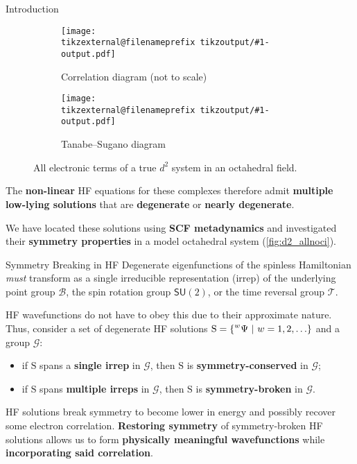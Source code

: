 \documentclass[final, xcolor={svgnames}]{beamer}
\makeatletter
\newif\iftikzex
\newcommand*{\useexternalfile}[1]{%
		\iftikzex
			\tikzsetnextfilename{tikzoutput/#1-output}%
			\scalebox{1}{}
		\else
			\texttt{[image: \\tikzexternal@filenameprefix tikzoutput/\#1-output.pdf]}
		\fi
	}
\newlength{\colwidth}
\makeatother
\begin{document}
\begin{frame}[t]
\begin{columns}[t]
\begin{column}{\colwidth}
\begin{block}{Introduction}
				\begin{figure}
					\begin{subfigure}[b]{0.49\textwidth}
						\centering
						\useexternalfile{corrd2}
						\caption{Correlation diagram (not to scale)}
					\end{subfigure}
					\hfill
					\begin{subfigure}[b]{0.49\textwidth}
						\centering
						\useexternalfile{TSd2}
						\caption{Tanabe--Sugano diagram}
					\end{subfigure}
					\caption{All electronic terms of a true $d^2$ system in an octahedral field.}
					\label{fig:corrTSd2}
				\end{figure}
				
			The \textbf{\color{Blue} non-linear} HF equations for these complexes therefore admit \textbf{\color{Blue} multiple low-lying solutions} that are \textbf{\color{Blue} degenerate} or \textbf{\color{Blue} nearly degenerate}.
			
			We have located these solutions using \textbf{\color{red} SCF metadynamics} and investigated their \textbf{\color{red} symmetry properties} in a model octahedral  system (\cref{fig:d2_allnoci}).
	  	\end{block}
	
		\begin{alertblock}{Symmetry Breaking in HF}
			Degenerate eigenfunctions of the spinless Hamiltonian \emph{must} transform as a single irreducible representation (irrep) of the underlying point group $\mathcal{B}$, the spin rotation group $\mathsf{SU}(2)$, or the time reversal group $\mathcal{T}$.

			HF wavefunctions do not have to obey this due to their approximate nature. Thus, consider a set of degenerate HF solutions %
				$\mathrm{S} =
					\left\lbrace
						\prescript{w}{}{\Psi} %
						\ | \ %
						w = 1, 2, \ldots %
					\right\rbrace%
				$ %
			and a group $\mathcal{G}$:
				\begin{itemize}
					\item if $\mathrm{S}$ spans a \textbf{\color{Blue} single irrep} in $\mathcal{G}$, then $\mathrm{S}$ is \textbf{\color{red} symmetry-conserved} in $\mathcal{G}$;
					\item if $\mathrm{S}$ spans \textbf{\color{Blue} multiple
					irreps} in $\mathcal{G}$, then $\mathrm{S}$ is \textbf{\color{red} symmetry-broken} in $\mathcal{G}$.
				\end{itemize}

			HF solutions break symmetry to become lower in energy and possibly recover some electron correlation. \textbf{\color{Blue} Restoring symmetry} of symmetry-broken HF solutions allows us to form \textbf{\color{Blue} physically meaningful wavefunctions} while \textbf{\color{Blue} incorporating said correlation}.
		\end{alertblock}
	

\end{column}
\end{columns}
\end{frame}
\end{document}
